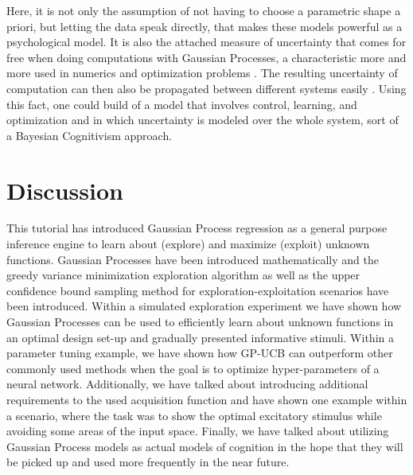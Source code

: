 \documentclass[authoryear,11pt,review]{elsarticle}
\begin{document}
Here, it is not only the assumption of not having to choose a parametric shape a priori, but letting the data speak directly, that makes these models powerful as a psychological model. It is also the attached measure of uncertainty that comes for free when doing computations with Gaussian Processes, a characteristic more and more used in numerics \citep{hennig2015probabilistic} and optimization problems \citep{hennig2013quasi}. The resulting uncertainty of computation can then also be propagated between different systems easily \citep{damianou2012deep}. Using this fact, one could build of a model that involves control, learning, and optimization and in which uncertainty is modeled over the whole system, sort of a Bayesian Cognitivism approach.


\section{Discussion}
This tutorial has introduced Gaussian Process regression as a general purpose inference engine to learn about (explore) and maximize (exploit) unknown functions. Gaussian Processes have been introduced mathematically and the greedy variance minimization exploration algorithm as well as the upper confidence bound sampling method for exploration-exploitation scenarios have been introduced. Within a simulated exploration experiment we have shown how Gaussian Processes can be used to efficiently learn about unknown functions in an optimal design set-up and gradually presented informative stimuli. Within a parameter tuning example, we have shown how GP-UCB can outperform other commonly used methods when the goal is to optimize hyper-parameters of a neural network. Additionally, we have talked about introducing additional requirements to the used acquisition function and have shown one example within a scenario, where the task was to show the optimal excitatory stimulus while avoiding some areas of the input space. Finally, we have talked about utilizing Gaussian Process models as actual models of cognition in the hope that they will be picked up and used more frequently in the near future.\\
\end{document}
